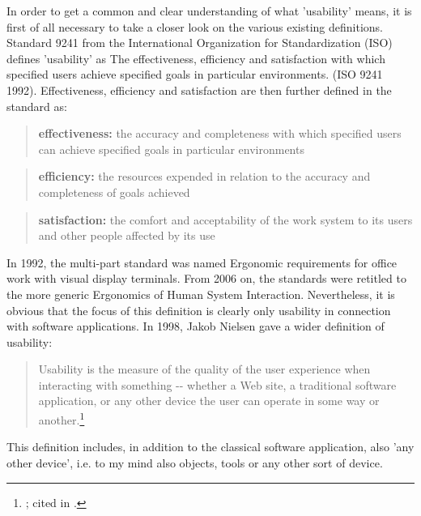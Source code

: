 \begin{styleBodyTextIndent}
In order to get a common and clear understanding of what 'usability' means, it is first of all necessary to take a closer look on the various existing definitions. Standard 9241 from the International Organization for Standardization (ISO) defines 'usability' as {\textquotedbl}The effectiveness, efficiency and satisfaction with which specified users achieve specified goals in particular environments.{\textquotedbl} (ISO 9241 1992). Effectiveness, efficiency and satisfaction are then further defined in the standard as: 
\end{styleBodyTextIndent}

\begin{quote}
\textbf{{\textquotedbl}effectiveness: }the accuracy and completeness with which specified users can achieve specified goals in particular environments
\end{quote}

\begin{quote}
\textbf{efficiency:} the resources expended in relation to the accuracy and completeness of goals achieved
\end{quote}

\begin{quote}
\textbf{satisfaction:} the comfort and acceptability of the work system to its users and other people affected by its use{\textquotedbl}
\end{quote}

In 1992, the multi-part standard was named {\textquotedbl}Ergonomic requirements for office work with visual display terminals{\textquotedbl}. From 2006 on, the standards were retitled to the more generic {\textquotedbl}Ergonomics of Human System Interaction{\textquotedbl}. Nevertheless, it is obvious that the focus of this definition is clearly only usability in connection with software applications. In 1998, Jakob Nielsen gave a wider definition of usability:

\begin{quote}
{\textquotedbl}Usability is the measure of the quality of the user experience when interacting with something -{}- whether a Web site, a traditional software application, or any other device the user can operate in some way or another.{\textquotedbl}\footnote{ \citet{Nielsen1998}; cited in \citet{Eichinger1999}.}
\end{quote}

This definition includes, in addition to the classical software application, also 'any other device', i.e. to my mind also objects, tools or any other sort of device. 

